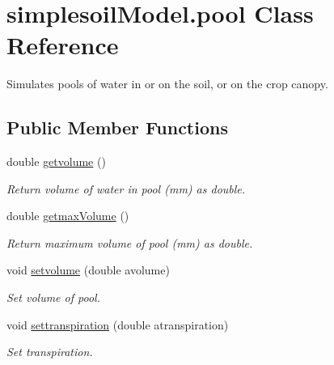 \hypertarget{classsimplesoil_model_1_1pool}{}\section{simplesoil\+Model.\+pool Class Reference}
\label{classsimplesoil_model_1_1pool}


Simulates pools of water in or on the soil, or on the crop canopy.  


\subsection*{Public Member Functions}
\begin{DoxyCompactItemize}
\item 
\mbox{\label{classsimplesoil_model_1_1pool_a29dc8988f752b7b7e1189d2442a431bd}} 
double \mbox{\hyperlink{classsimplesoil_model_1_1pool_a29dc8988f752b7b7e1189d2442a431bd}{getvolume}} ()
\begin{DoxyCompactList}\small\item\em Return volume of water in pool (mm) as double. \end{DoxyCompactList}\item 
\mbox{\label{classsimplesoil_model_1_1pool_ae038949bd94e78acf1fca1e82e6eae30}} 
double \mbox{\hyperlink{classsimplesoil_model_1_1pool_ae038949bd94e78acf1fca1e82e6eae30}{getmax\+Volume}} ()
\begin{DoxyCompactList}\small\item\em Return maximum volume of pool (mm) as double. \end{DoxyCompactList}\item 
void \mbox{\hyperlink{classsimplesoil_model_1_1pool_a2459746f840a3d2a6de1748cd430aafc}{setvolume}} (double avolume)
\begin{DoxyCompactList}\small\item\em Set volume of pool. \end{DoxyCompactList}\item 
void \mbox{\hyperlink{classsimplesoil_model_1_1pool_ac816508405bffebca3d5c475935d642f}{settranspiration}} (double atranspiration)
\begin{DoxyCompactList}\small\item\em Set transpiration. \end{DoxyCompactList}\item 

\end{DoxyCompactItemize}
